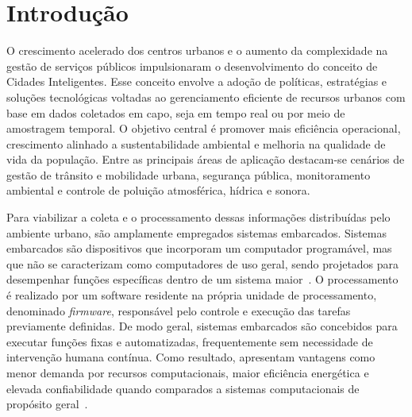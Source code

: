
\section{Introdução}








O crescimento acelerado dos centros urbanos e o aumento da complexidade na gestão de serviços públicos impulsionaram o desenvolvimento do conceito de Cidades Inteligentes. Esse conceito envolve a adoção de políticas, estratégias e soluções tecnológicas voltadas ao gerenciamento eficiente de recursos urbanos com base em dados coletados em capo, seja em tempo real ou por meio de amostragem temporal. O objetivo central é promover mais eficiência operacional, crescimento alinhado a sustentabilidade ambiental e melhoria na qualidade de vida da população. Entre as principais áreas de aplicação destacam-se cenários de gestão de trânsito e mobilidade urbana, segurança pública, monitoramento ambiental e controle de poluição atmosférica, hídrica e sonora.

Para viabilizar a coleta e o processamento dessas informações distribuídas pelo ambiente urbano, são amplamente empregados sistemas embarcados. Sistemas embarcados são dispositivos que incorporam um computador programável, mas que não se caracterizam como computadores de uso geral, sendo projetados para desempenhar funções específicas dentro de um sistema maior~\cite{wolf2003embedded}. O processamento é realizado por um software residente na própria unidade de processamento, denominado \textit{firmware}, responsável pelo controle e execução das tarefas previamente definidas. De modo geral, sistemas embarcados são concebidos para executar funções fixas e automatizadas, frequentemente sem necessidade de intervenção humana contínua. Como resultado, apresentam vantagens como menor demanda por recursos computacionais, maior eficiência energética e elevada confiabilidade quando comparados a sistemas computacionais de propósito geral~\cite{almeida2016programacao}.

